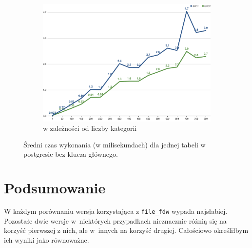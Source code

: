 \documentclass[a4paper,11pt]{article}
\begin{document}
\begin{figure}[h!]
    \begin{subfigure}{.5\textwidth}
        \centering
        \includegraphics[width=\textwidth]{charts/execution-time-sql-one-table-no-pk-number_of_categories}
        \caption{w zależności od liczby kategorii}
    \end{subfigure}
    \caption{Średni czas wykonania (w milisekundach) dla jednej tabeli w postgresie bez klucza głównego.}
    \label{execution-time-sql-one-table-no-pk}
\end{figure}


\section{Podsumowanie}

W każdym porównaniu wersja korzystająca z \texttt{file\_fdw} wypada najsłabiej.
Pozostałe dwie wersje w~niektórych przypadkach nieznacznie różnią się na korzyść pierwszej z nich,
ale w~innych na korzyść drugiej. Całościowo określiłbym ich wyniki jako równoważne.
\end{document}
